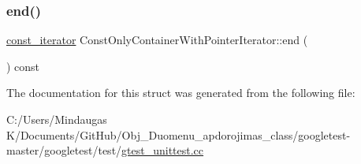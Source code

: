 \mbox{\label{struct_const_only_container_with_pointer_iterator_a041683280e1319a08467fa9035098cff}} 
\subsubsection{\texorpdfstring{end()}{end()}\hspace{0.1cm}{\footnotesize\ttfamily [2/2]}}
{\footnotesize\ttfamily \mbox{\hyperlink{struct_const_only_container_with_pointer_iterator_a652efbd2c6da61e65cc45123e4182713}{const\+\_\+iterator}} Const\+Only\+Container\+With\+Pointer\+Iterator\+::end (\begin{DoxyParamCaption}{ }\end{DoxyParamCaption}) const}



The documentation for this struct was generated from the following file\+:\begin{DoxyCompactItemize}
\item 
C\+:/\+Users/\+Mindaugas K/\+Documents/\+Git\+Hub/\+Obj\+\_\+\+Duomenu\+\_\+apdorojimas\+\_\+class/googletest-\/master/googletest/test/\mbox{\hyperlink{googletest-master_2googletest_2test_2gtest__unittest_8cc}{gtest\+\_\+unittest.\+cc}}\end{DoxyCompactItemize}
